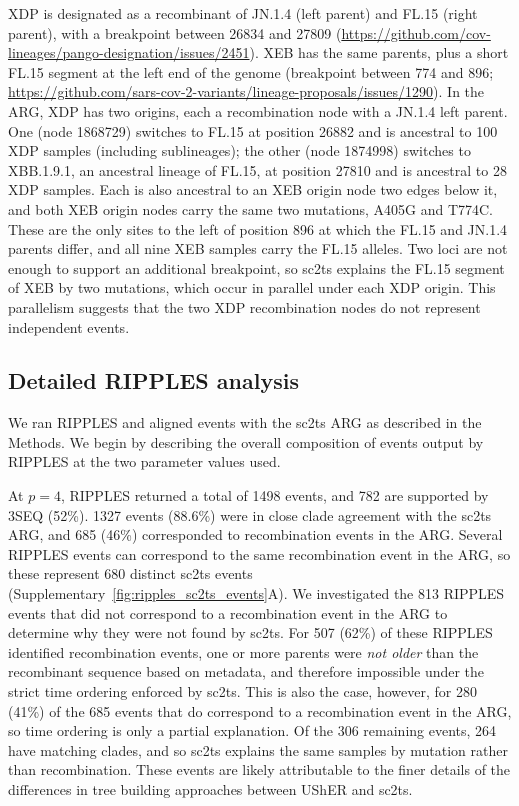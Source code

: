 \documentclass[12pt]{article}
\newcommand{\siref}[1]{Supplementary~\ref{#1}}
\begin{document}
XDP is designated as a recombinant of JN.1.4 (left parent) and FL.15 (right parent),
with a breakpoint between 26834 and 27809
(\url{https://github.com/cov-lineages/pango-designation/issues/2451}).
XEB has the same parents, plus a short FL.15 segment
at the left end of the genome (breakpoint between 774 and 896;
\url{https://github.com/sars-cov-2-variants/lineage-proposals/issues/1290}).
In the ARG, XDP has two origins,
each a recombination node with a JN.1.4 left parent.
One (node 1868729) switches to FL.15 at position 26882
and is ancestral to 100 XDP samples (including sublineages);
the other (node 1874998) switches to XBB.1.9.1,
an ancestral lineage of FL.15, at position 27810
and is ancestral to 28 XDP samples.
Each is also ancestral to an XEB origin node two edges below it,
and both XEB origin nodes carry the same two mutations, A405G and T774C.
These are the only sites to the left of position 896
at which the FL.15 and JN.1.4 parents differ,
and all nine XEB samples carry the FL.15 alleles.
Two loci are not enough to support an additional breakpoint,
so sc2ts explains the FL.15 segment of XEB
by two mutations, which occur in parallel under each XDP origin.
This parallelism suggests that the two XDP recombination nodes
do not represent independent events.

\subsection{Detailed RIPPLES analysis}
\label{sec:detailed_ripples}
We ran RIPPLES and aligned events with the sc2ts ARG as described in
the Methods. We begin by describing the overall composition of events output
by RIPPLES at the two parameter values used.

At $p=4$, RIPPLES returned a total of 1498 events, and
782 are supported by 3SEQ (52\%). 1327 events
(88.6\%) were in close clade agreement with the sc2ts ARG,
and 685 (46\%) corresponded to recombination events in the ARG.
Several RIPPLES events can correspond to the same recombination event
in the ARG, so these represent 680 distinct sc2ts events
(\siref{fig:ripples_sc2ts_events}A).
We investigated the 813 RIPPLES events that did not correspond
to a recombination event in the ARG
to determine why they were not found by sc2ts.
For 507 (62\%) of these RIPPLES identified recombination events,
one or more parents were \emph{not older} than the
recombinant sequence based on metadata,
and therefore impossible under the strict time ordering
enforced by sc2ts.
This is also the case, however, for 280 (41\%) of the 685 events
that do correspond to a recombination event in the ARG,
so time ordering is only a partial explanation.
Of the 306 remaining events, 264 have matching clades,
and so sc2ts explains the same samples by mutation rather than recombination.
These events are likely attributable
to the finer details of the
differences in tree building approaches between UShER and sc2ts.
\end{document}
